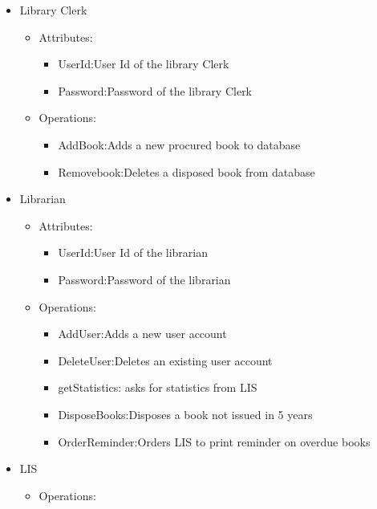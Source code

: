 \documentclass[a4paper]{article}
\begin{document}
\begin{itemize}
\begin{itemize}
\begin{itemize}
\end{itemize}
\end{itemize}

\item Library Clerk
\begin{itemize}
\item Attributes:
\begin{itemize}
\item UserId:User Id of the library Clerk\\
\item Password:Password of the library Clerk\\
\end{itemize}

\item Operations:
\begin{itemize}
\item AddBook:Adds a new procured book to database\\
\item Removebook:Deletes a disposed book from database\\
\end{itemize}
\end{itemize}
\item Librarian

\begin{itemize}

\item Attributes:
\begin{itemize}
\item UserId:User Id of the librarian
\item Password:Password of the librarian
\end{itemize}
\item Operations:
\begin{itemize}
\item AddUser:Adds a new user account
\item DeleteUser:Deletes an existing user account
\item getStatistics: asks for statistics from LIS
\item DisposeBooks:Disposes a book not issued in 5 years
\item OrderReminder:Orders LIS to print reminder on overdue books
\end{itemize}
\end{itemize}

\item LIS
\begin{itemize}
\item Operations:\\
\begin{itemize}


\end{itemize}
\end{itemize}
\end{itemize}
\end{document}
